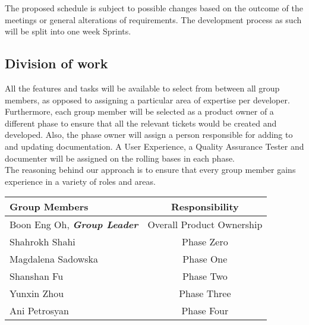 \documentclass[a4paper,11pt]{article}
\begin{document}
\indent The proposed schedule is subject to possible changes based on the outcome of the meetings or general alterations of requirements. The development process as such will be split into one week Sprints.

\subsection{Division of work}
\noindent All the features and tasks will be available to select from between all group members, as opposed to assigning a particular area of expertise per developer.
\\
\indent Furthermore, each group member will be selected as a product owner of a different phase to ensure that all the relevant tickets would be created and developed. Also, the phase owner will assign a person responsible for adding to and updating documentation. A User Experience, a Quality Assurance Tester and documenter will be assigned on the rolling bases in each phase.
\\
\indent The reasoning behind our approach is to ensure that every group member gains experience in a variety of roles and areas.

\begin{center}
 \label{tab:title2} 
\begin{tabular}{  m{10cm}  c  }
\textbf{Group Members} & \textbf{Responsibility}\\
\hline
Boon Eng Oh, \textbf{\textit{Group Leader}} &  Overall Product Ownership  \\
Shahrokh Shahi &   Phase Zero  \\
Magdalena Sadowska &   Phase One   \\
Shanshan Fu &   Phase Two   \\
Yunxin Zhou &   Phase Three   \\
Ani Petrosyan &  Phase Four   \\
\hline
\end{tabular}
\end{center}
\end{document}
